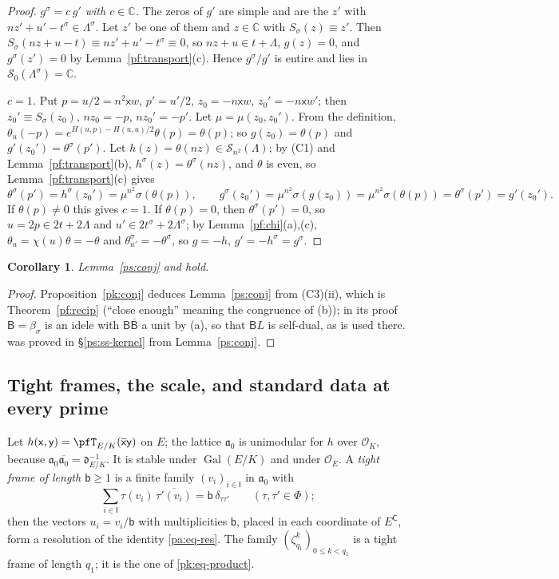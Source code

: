 \documentclass[10pt]{amsart}
\newtheorem{corollary}[theorem]{Corollary}
\theoremstyle{definition}
\theoremstyle{remark}
\newcommand{\C}{\mathbb C}
\providecommand{\auO}{\mathcal O}
\providecommand{\auPl}{\Phi}
\providecommand{\aubar}[1]{\overline{#1}}
\begin{document}
\begin{proof}
\emph{$g^\sigma=c\,g'$ with $c\in\C$.} The zeros of $g'$ are simple and are the $z'$ with
$nz'+u'-t^\sigma\in\Lambda^\sigma$. Let $z'$ be one of them and $z\in\C$ with $S_\sigma(z)\equiv
z'$. Then $S_\sigma(nz+u-t)\equiv nz'+u'-t^\sigma\equiv0$, so $nz+u\in t+\Lambda$, $g(z)=0$, and
$g^\sigma(z')=0$ by Lemma~\ref{pf:transport}(c). Hence $g^\sigma/g'$ is entire and lies in
$\mathcal S_0(\Lambda^\sigma)=\C$.

\emph{$c=1$.} Put $p=u/2=n^2\mathsf xw$, $p'=u'/2$, $z_0=-n\mathsf xw$, $z_0'=-n\mathsf xw'$; then
$z_0'\equiv S_\sigma(z_0)$, $nz_0=-p$, $nz_0'=-p'$. Let $\mu=\mu(z_0,z_0')$. From the definition,
$\theta_u(-p)=e^{H(u,p)-H(u,u)/2}\theta(p)=\theta(p)$; so $g(z_0)=\theta(p)$ and $g'(z_0')=
\theta^\sigma(p')$. Let $h(z)=\theta(nz)\in\mathcal S_{n^2}(\Lambda)$; by (C1) and
Lemma~\ref{pf:transport}(b), $h^\sigma(z)=\theta^\sigma(nz)$, and $\theta$ is even, so
Lemma~\ref{pf:transport}(c) gives
\[
\theta^\sigma(p')=h^\sigma(z_0')=\mu^{n^2}\sigma(\theta(p)),\qquad g^\sigma(z_0')=\mu^{n^2}\sigma
(g(z_0))=\mu^{n^2}\sigma(\theta(p))=\theta^\sigma(p')=g'(z_0').
\]
If $\theta(p)\ne0$ this gives $c=1$. If $\theta(p)=0$, then $\theta^\sigma(p')=0$, so
$u=2p\in2t+2\Lambda$ and $u'\in2t^\sigma+2\Lambda^\sigma$; by Lemma~\ref{pf:chi}(a),(c),
$\theta_u=\chi(u)\theta=-\theta$ and $\theta^\sigma_{u'}=-\theta^\sigma$, so $g=-h$,
$g'=-h^\sigma=g^\sigma$.
\end{proof}

\begin{corollary}\label{pf:conj}
Lemma~\ref{ps:conj} and {\cite[Proposition~14.23]{P46}} hold.
\end{corollary}
\begin{proof}
Proposition~\ref{pk:conj} deduces Lemma~\ref{ps:conj} from (C3)(ii), which is
Theorem~\ref{pf:recip} (``close enough'' meaning the congruence of (b)); in its proof $\mathsf
B=\beta_\sigma$ is an idele with $\mathsf B\aubar{\mathsf B}$ a unit by (a), so that $\mathsf BL$
is self-dual, as is used there. {\cite[Proposition~14.23]{P46}} was proved in \S\ref{ps:ss-kernel} from
Lemma~\ref{ps:conj}.
\end{proof}

\subsection{Tight frames, the scale, and standard data at every prime}\label{pf:ss-frames}

Let $h(\mathsf x,\mathsf y)=\pfT_{E/K}(\aubar{\mathsf x}\mathsf y)$ on $E$; the lattice
$\mathfrak a_0$ is unimodular for $h$ over $\auO_K$, because $\mathfrak a_0\aubar{\mathfrak a_0}=
\mathfrak d_{E/K}^{-1}$. It is stable under $\operatorname{Gal}(E/K)$ and under $\auO_E$. A
\emph{tight frame of length $\mathsf b\ge1$} is a finite family $(v_i)_{i\in\mathsf I}$ in
$\mathfrak a_0$ with
\[
\sum_{i\in\mathsf I}\tau(v_i)\,\aubar{\tau'(v_i)}=\mathsf b\,\delta_{\tau\tau'}\qquad(\tau,\tau'\in
\auPl);
\]
then the vectors $u_i=v_i/\mathsf b$ with multiplicities $\mathsf b$, placed in each coordinate
of $E^{\mathsf C}$, form a resolution of the identity \eqref{pa:eq-res}. The family
$(\zeta_{q_1}^k)_{0\le k<q_1}$ is a tight frame of length $q_1$; it is the one of
\eqref{pk:eq-product}.
\end{document}
